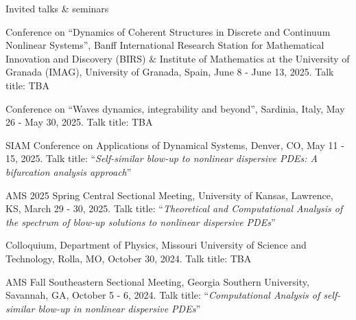 \documentclass[10pt]{article} %
\newenvironment{benumerate}[1]{
    \let\oldItem\item
    \def\item{\addtocounter{enumi}{-2}\oldItem}
    \begin{enumerate}
    \setcounter{enumi}{#1}
    \addtocounter{enumi}{1}
}{
    \end{enumerate}
}
\begin{document}

\begin{section}{Invited talks \& seminars}
\begin{etaremune}
\setlength\itemsep{1em}

\item
\vskip  -6.5mm

Conference on ``Dynamics of Coherent Structures in Discrete and Continuum Nonlinear Systems'', Banff International
Research Station for Mathematical Innovation and Discovery (BIRS) \& Institute of Mathematics at the
University of Granada (IMAG), University of Granada, Spain, June 8 - June 13, 2025. Talk title: TBA

\item Conference on ``Waves dynamics, integrability and beyond'', Sardinia, Italy, May 26 - May 30, 2025.
Talk title: TBA

\item SIAM Conference on Applications of Dynamical Systems, Denver, CO, May 11 - 15, 2025.
Talk title: ``\textit{Self-similar blow-up to nonlinear dispersive PDEs: A bifurcation analysis approach}''

\item AMS 2025 Spring Central Sectional Meeting, University of Kansas, Lawrence, KS, March 29 - 30, 2025.
Talk title: ``\textit{Theoretical and Computational Analysis of the spectrum of blow-up solutions to nonlinear dispersive PDEs}''

\item Colloquium, Department of Physics, Missouri University of Science and Technology, Rolla, MO, October 30, 2024.
Talk title: TBA

\item AMS Fall Southeastern Sectional Meeting, Georgia Southern University, Savannah, GA, October 5 - 6, 2024.
Talk title: ``\textit{Computational Analysis of self-similar blow-up in nonlinear dispersive PDEs}''


\end{etaremune}
\end{section}
\end{document}

